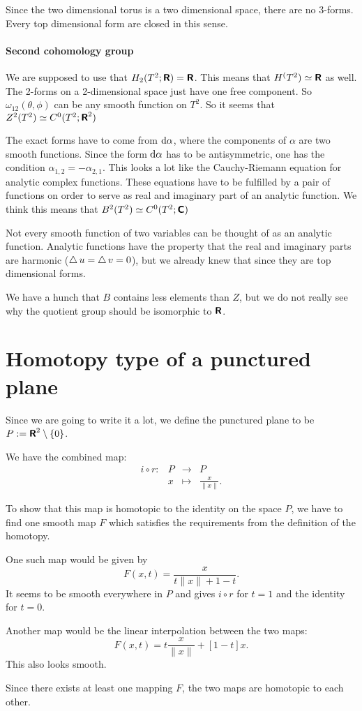 \documentclass[11pt, english, fleqn, DIV=15, headinclude, BCOR=1cm]{scrartcl}
\begin{document}
Since the two dimensional torus is a two dimensional space, there are no
3-forms. Every top dimensional form are closed in this sense.

\paragraph{Second cohomology group}

We are supposed to use that $H_2(T^2; \text{\bfseries\sffamily R}) = \text{\bfseries\sffamily R}$. This means that $H^(T^2)
\simeq \text{\bfseries\sffamily R}$ as well. The 2-forms on a 2-dimensional space just have one free
component. So $\omega_{12}(\theta, \phi)$ can be any smooth function on $T^2$.
So it seems that $Z^2(T^2) \simeq C^0(T^2; \text{\bfseries\sffamily R}^2)$

The exact forms have to come from $\mathop{}\!\mathrm d \alpha$, where the components of
$\alpha$ are two smooth functions. Since the form $\mathop{}\!\mathrm d \alpha$ has to be
antisymmetric, one has the condition $\alpha_{1,2} = - \alpha_{2,1}$. This
looks a lot like the Cauchy-Riemann equation for analytic complex functions.
These equations have to be fulfilled by a pair of functions on order to serve
as real and imaginary part of an analytic function. We think this means that
$B^2(T^2) \simeq C^0(T^2; \text{\bfseries\sffamily C})$

Not every smooth function of two variables can be thought of as an analytic
function. Analytic functions have the property that the real and imaginary
parts are harmonic ($\operatorname{\bigtriangleup} u = \operatorname{\bigtriangleup} v = 0$), but we already knew that
since they are top dimensional forms.

We have a hunch that $B$ contains less elements than $Z$, but we do not really
see why the quotient group should be isomorphic to $\text{\bfseries\sffamily R}$.

\section{Homotopy type of a punctured plane}
\label{homework:3}

Since we are going to write it a lot, we define the punctured plane to be $P :=
\text{\bfseries\sffamily R}^2 \setminus \{ 0 \}$.

We have the combined map:
\[
    \begin{matrix}
        i \circ r \colon & P & \to & P \\
    & x & \mapsto & \frac{x}{\| x \|}.
    \end{matrix}
\]

To show that this map is homotopic to the identity on the space $P$, we have to
find one smooth map $F$ which satisfies the requirements from the definition of
the homotopy.

One such map would be given by
\[
    F(x, t) = \frac{x}{t \| x \| + 1 - t}.
\]
It seems to be smooth everywhere in $P$ and gives $i \circ r$ for $t = 1$ and
the identity for $t = 0$.

Another map would be the linear interpolation between the two maps:
\[
    F(x, t) = t \frac{x}{\| x \|} + [1-t] x.
\]
This also looks smooth.

Since there exists at least one mapping $F$, the two maps are homotopic to each
other.
\end{document}
